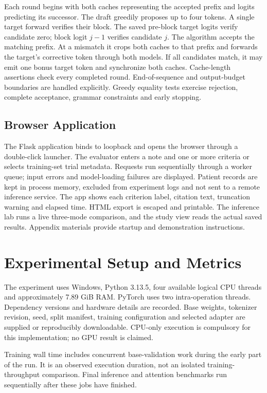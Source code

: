 \documentclass[conference]{IEEEtran}
\begin{document}
Each round begins with both caches representing the accepted prefix and logits predicting its successor. The draft greedily proposes up to four tokens. A single target forward verifies their block. The saved pre-block target logits verify candidate zero; block logit $j-1$ verifies candidate $j$. The algorithm accepts the matching prefix. At a mismatch it crops both caches to that prefix and forwards the target's corrective token through both models. If all candidates match, it may emit one bonus target token and synchronize both caches. Cache-length assertions check every completed round. End-of-sequence and output-budget boundaries are handled explicitly. Greedy equality tests exercise rejection, complete acceptance, grammar constraints and early stopping.

\subsection{Browser Application}
The Flask application binds to loopback and opens the browser through a double-click launcher. The evaluator enters a note and one or more criteria or selects training-set trial metadata. Requests run sequentially through a worker queue; input errors and model-loading failures are displayed. Patient records are kept in process memory, excluded from experiment logs and not sent to a remote inference service. The app shows each criterion label, citation text, truncation warning and elapsed time. HTML export is escaped and printable. The inference lab runs a live three-mode comparison, and the study view reads the actual saved results. Appendix materials provide startup and demonstration instructions.

\section{Experimental Setup and Metrics}
The experiment uses Windows, Python 3.13.5, four available logical CPU threads and approximately 7.89 GiB RAM. PyTorch uses two intra-operation threads. Dependency versions and hardware details are recorded. Base weights, tokenizer revision, seed, split manifest, training configuration and selected adapter are supplied or reproducibly downloadable. CPU-only execution is compulsory for this implementation; no GPU result is claimed.

Training wall time includes concurrent base-validation work during the early part of the run. It is an observed execution duration, not an isolated training-throughput comparison. Final inference and attention benchmarks run sequentially after these jobs have finished.
\end{document}
